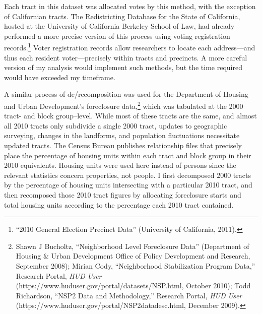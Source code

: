 \documentclass[12pt,oneside]{psthesis}
\begin{document}
Each tract in this dataset was allocated votes by this method, with the exception of Californian tracts.
The Redistricting Database for the State of California, hosted at the University of California Berkeley School of Law, had already performed a more precise version of this process using voting registration records.\footnote{``2010 General Election Precinct Data'' (University of California, 2011).}
Voter registration records allow researchers to locate each address---and thus each resident voter---precisely within tracts and precincts.
A more careful version of my analysis would implement such methods, but the time required would have exceeded my timeframe.

A similar process of de/recomposition was used for the Department of Housing and Urban Development's foreclosure data,\footnote{Shawn J Bucholtz, ``Neighborhood Level Foreclosure Data'' (Department of Housing \& Urban Development Office of Policy Development and Research, September 2008); Mirian Cody, ``Neighborhood Stabilization Program Data,'' Research Portal, \emph{HUD User} (https://www.huduser.gov/portal/datasets/NSP.html, October 2010); Todd Richardson, ``NSP2 Data and Methodology,'' Research Portal, \emph{HUD User} (https://www.huduser.gov/portal/NSP2datadesc.html, December 2009).} which was tabulated at the 2000 tract- and block group--level.
While most of these tracts are the same, and almost all 2010 tracts only subdivide a single 2000 tract, updates to geographic surveying, changes in the landforms, and population fluctuations necessitate updated tracts.
The Census Bureau publishes relationship files that precisely place the percentage of housing units within each tract and block group in their 2010 equivalents.
Housing units were used here instead of persons since the relevant statistics concern properties, not people.
I first decomposed 2000 tracts by the percentage of housing units intersecting with a particular 2010 tract, and then recomposed those 2010 tract figures by allocating foreclosure starts and total housing units according to the percentage each 2010 tract contained.
\end{document}
